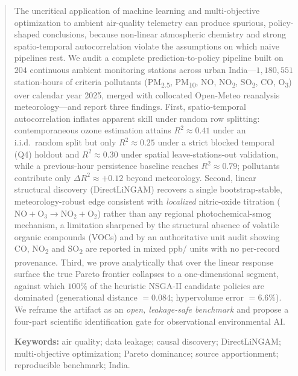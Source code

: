 \begin{abstract}
\noindent
The uncritical application of machine learning and multi-objective optimization to
ambient air-quality telemetry can produce spurious, policy-shaped conclusions,
because non-linear atmospheric chemistry and strong spatio-temporal autocorrelation
violate the assumptions on which naive pipelines rest. We audit a complete
prediction-to-policy pipeline built on $204$ continuous ambient monitoring stations
across urban India---$1{,}180{,}551$ station-hours of criteria pollutants
(PM\textsubscript{2.5}, PM\textsubscript{10}, NO, NO\textsubscript{2},
SO\textsubscript{2}, CO, O\textsubscript{3}) over calendar year 2025, merged with
collocated Open-Meteo reanalysis meteorology---and report three findings. First,
spatio-temporal autocorrelation inflates apparent skill under random row splitting:
contemporaneous ozone estimation attains $R^2 \approx 0.41$ under an i.i.d.\ random
split but only $R^2 \approx 0.25$ under a strict blocked temporal (Q4) holdout and
$R^2 \approx 0.30$ under spatial leave-stations-out validation, while a previous-hour
persistence baseline reaches $R^2 \approx 0.79$; pollutants contribute only
$\Delta R^2 \approx +0.12$ beyond meteorology. Second, linear structural discovery
(DirectLiNGAM) recovers a single bootstrap-stable, meteorology-robust edge consistent
with \emph{localized} nitric-oxide titration ($\mathrm{NO}+\mathrm{O_3}\rightarrow
\mathrm{NO_2}+\mathrm{O_2}$) rather than any regional photochemical-smog mechanism,
a limitation sharpened by the structural absence of volatile organic compounds
(VOCs) and by an authoritative unit audit showing CO, NO\textsubscript{2} and
SO\textsubscript{2} are reported in mixed ppb/\ugm{} units with no per-record
provenance. Third, we prove analytically that over the linear response surface the
true Pareto frontier collapses to a one-dimensional segment, against which
$100\%$ of the heuristic NSGA-II candidate policies are dominated (generational
distance $=0.084$; hypervolume error $=6.6\%$). We reframe the artifact as an
\emph{open, leakage-safe benchmark} and propose a four-part scientific
identification gate for observational environmental AI.

\medskip
\noindent\textbf{Keywords:} air quality; data leakage; causal discovery;
DirectLiNGAM; multi-objective optimization; Pareto dominance; source apportionment;
reproducible benchmark; India.
\end{abstract}
